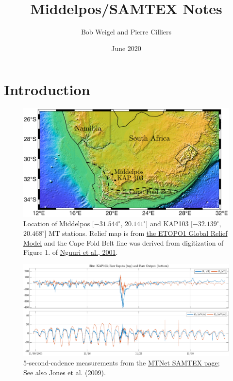 \documentclass{article}
\title{Middelpos/SAMTEX Notes}
\author{Bob Weigel and Pierre Cilliers}
\date{June 2020}
\begin{document}
\section{Introduction}


\begin{figure}[h!]
\centering
\includegraphics[width=\textwidth]{figures/map.pdf}
\caption{Location of Middelpos [$-31.544^\circ$, $20.141^\circ$] and KAP103 [$-32.139^\circ$, $20.468^\circ$] MT stations. Relief map is from \href{http://ngdc.noaa.gov/mgg/global/global.html}{the ETOPO1 Global Relief Model} and the Cape Fold Belt line was derived from digitization of Figure 1. of \href{https://agupubs.onlinelibrary.wiley.com/doi/pdf/10.1029/2000GL012587}{Nguuri et al., 2001}.}
\label{fig:map}
\end{figure}

\begin{figure}[h!]
\centering
\includegraphics[width=\textwidth]{figures/KAP103/timeseries.pdf}
\caption{5-second-cadence measurements from the \href{https://www.mtnet.info/data/samtex/samtex.html}{MTNet SAMTEX page}; See also Jones et al. (2009).}
\label{fig:KAP103_timeseries}
\end{figure}
\end{document}
